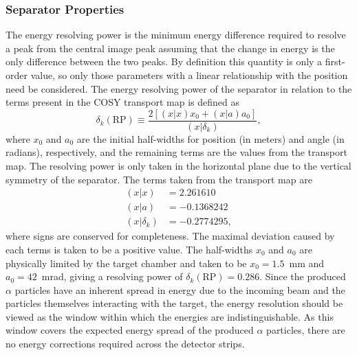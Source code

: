 \subsubsection{Separator Properties}
The energy resolving power is the minimum energy difference required to
resolve a peak from the central image peak assuming that the change in
energy is the only difference between the two peaks. By definition this
quantity is only a first-order value, so only those parameters with a
linear relationship with the position need be considered. The energy
resolving power of the separator in relation to the terms present in the
COSY transport map is defined as
\begin{equation}
    \delta_k(\textrm{RP}) \equiv
        \frac{2\left[(x|x)x_0 + (x|a)a_0\right]}{(x|\delta_k)},
\end{equation}
where $x_0$ and $a_0$ are the initial half-widths for position (in
meters) and angle (in radians), respectively, and the remaining terms
are the values from the transport map. The resolving power is only taken
in the horizontal plane due to the vertical symmetry of the separator.
The terms taken from the transport map are
\begin{align*}
    (x|x) &= 2.261610 \\
    (x|a) &= {-0.1368242} \\
    (x|\delta_k) &= {-0.2774295},
\end{align*}
where signs are conserved for completeness. The maximal deviation caused
by each terms is taken to be a positive value. The half-widths $x_0$ and
$a_0$ are physically limited by the target chamber and taken to be $x_0
= 1.5$~mm and $a_0 = 42$~mrad, giving a resolving power of
$\delta_k(\textrm{RP}) = 0.286$. Since the produced $\alpha$ particles
have an inherent spread in energy due to the incoming beam and the
particles themselves interacting with the target, the energy resolution
should be viewed as the window within which the energies are
indistinguishable. As this window covers the expected energy spread of
the produced $\alpha$ particles, there are no energy corrections
required across the detector strips.


